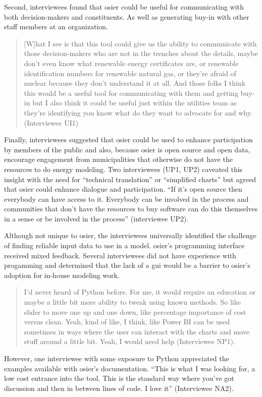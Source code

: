 Second, interviewees found that \ac{osier} could be useful for communicating
with both decision-makers and constituents. As well as generating buy-in with
other staff members at an organization.
\begin{quote}
    [W]hat I see is that this tool could give us the ability to communicate with
    those decision-makers who are not in the trenches about the details, maybe
    don't even know what renewable energy certificates are, or renewable
    identification numbers for renewable natural gas, or they're afraid of
    nuclear because they don't understand it at all. And those folks I think
    this would be a useful tool for communicating with them and getting buy-in
    but I also think it could be useful just within the utilities team as
    they're identifying you know what do they want to advocate for and why.
    (Interviewee UI1)
\end{quote}

Finally, interviewees suggested that \ac{osier} could be used to enhance
participation by members of the public and also, because \ac{osier} is open
source and open data, encourage engagement from municipalities that otherwise do
not have the resources to do energy modeling. Two interviewees (UP1, UP2)
caveated this insight with the need for ``technical translation'' or
``simplified charts'' but agreed that \ac{osier} could enhance dialogue and
participation. ``If it's open source then everybody can have access to it.
Everybody can be involved in the process and communities that don't have the
resources to buy software can do this themselves in a sense or be involved in
the process'' (interviewee UP2). 

Although not unique to \ac{osier}, the interviewees universally identified the
challenge of finding reliable input data to use in a model. \ac{osier}'s
programming interface received mixed feedback. Several interviewees did not have
experience with progamming and determined that the lack of a \ac{gui} would be a
barrier to \ac{osier}'s adoption for in-house modeling work. 
\begin{quote}
    I'd never heard of Python before. For me, it would require an education or
    maybe a little bit more ability to tweak using known methods. So like slider
    to move one up and one down, like percentage importance of cost versus
    clean. Yeah, kind of like, I think, like Power BI can be used sometimes in
    ways where the user can interact with the charts and move stuff around a
    little bit. Yeah, I would need help (Interviewee NP1).
\end{quote}
However, one interviewee with some exposure to Python appreciated the examples
available with \ac{osier}'s documentation. ``This is what I was looking for, a
low cost entrance into the tool. This is the standard way where you've got
discussion and then in between lines of code. I love it'' (Interviewee NA2).

